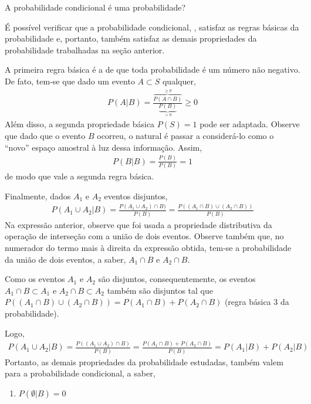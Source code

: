 \begin{example} {A probabilidade condicional é uma probabilidade?}

É possível verificar que a probabilidade condicional, , satisfaz as regras básicas da probabilidade e, portanto, também satisfaz as demais propriedades da probabilidade trabalhadas na seção anterior.

A primeira regra básica é a de que toda probabilidade é um número não negativo. De fato, tem-se que dado um evento \(A\subset S\) qualquer,
\begin{equation*}
\begin{split}P(A|B)=\frac{\overbrace{P(A\cap B)}^{\geq 0}}{\underbrace{P(B)}_{>0}}\geq 0\end{split}
\end{equation*}
Além disso, a segunda propriedade básica \(P(S)=1\) pode ser adaptada.  Observe que dado que o evento \(B\) ocorreu, o natural é passar a considerá-lo como o “novo” espaço amostral à luz dessa informação. Assim,
\begin{equation*}
\begin{split}P(B|B)=\frac{P(B)}{P(B)}=1\end{split}
\end{equation*}
de modo que vale a segunda regra básica.

Finalmente, dados \(A_1\) e \(A_2\)  eventos disjuntos,
\begin{equation*}
\begin{split}P(A_1\cup A_2|B)=\frac{P(A_1\cup A_2)\cap B)}{P(B)}=\frac{P((A_1\cap B)\cup(A_2\cap B))}{P(B)}\end{split}
\end{equation*}
Na expressão anterior, observe que foi usada a propriedade distributiva da operação de interseção com a união de dois eventos. Observe também que, no numerador do termo mais à direita da expressão obtida, tem-se a probabilidade da união de dois eventos, a saber, \(A_1\cap B\) e \(A_2\cap B\).

Como os eventos \(A_1\) e \(A_2\) são disjuntos, consequentemente, os eventos \(A_1\cap B\subset A_1\) e \(A_2\cap B\subset A_2\)  também são disjuntos tal que \(P((A_1\cap B)\cup(A_2\cap B))=P(A_1\cap B)+P(A_2\cap B)\) (regra básica 3 da probabilidade).

Logo,
\begin{equation*}
\begin{split}P(A_1\cup A_2|B)=\frac{P((A_1\cup A_2)\cap B)}{P(B)}=\frac{P(A_1\cap B)+P(A_2\cap B)}{P(B)}=P(A_1|B)+P(A_2|B)\end{split}
\end{equation*}
Portanto, as demais propriedades da probabilidade estudadas, também valem para a probabilidade condicional, a saber,
\begin{enumerate}
\item {} 
\(P(\emptyset |B)=0\)


\end{enumerate}
\end{example}

